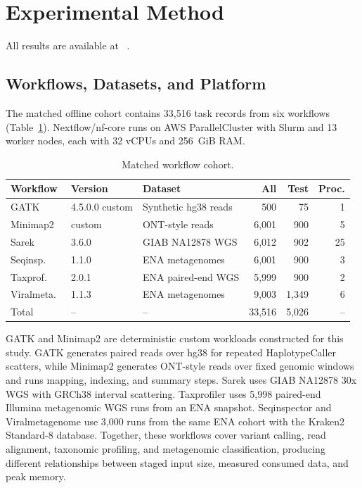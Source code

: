 \section{Experimental Method}
\label{sec:experiments}
All results are available at ~\cite{campArtifact}.

\subsection{Workflows, Datasets, and Platform}

The matched offline cohort contains 33,516 task records from six workflows
(Table~\ref{tab:cohort}). Nextflow/nf-core
\cite{ditommaso2017nextflow,nfcoreFramework} runs on AWS ParallelCluster with
Slurm and 13 worker nodes, each with 32 vCPUs and 256~GiB RAM. %

\begin{table}[t]
\caption{Matched workflow cohort.}
\label{tab:cohort}
\centering
\small
\setlength{\tabcolsep}{1.4pt}
\renewcommand{\arraystretch}{1.05}
\begin{tabular}{@{}l l p{} r r r@{}}
\toprule
Workflow & Version & Dataset & All & Test & Proc. \\
\midrule
GATK & 4.5.0.0 custom & Synthetic hg38 reads & 500 & 75 & 1 \\
Minimap2 & custom & ONT-style reads & 6,001 & 900 & 5 \\
Sarek~\cite{nfcoreSarekGithub} & 3.6.0 & GIAB NA12878 WGS & 6,012 & 902 & 25 \\
Seqinsp.~\cite{nfcoreSeqinspectorGithub} & 1.1.0 & ENA metagenomes & 6,001 & 900 & 3 \\
Taxprof.~\cite{nfcoreTaxprofilerGithub} & 2.0.1 & ENA paired-end WGS & 5,999 & 900 & 2 \\
Viralmeta.~\cite{nfcoreViralmetagenomeGithub} & 1.1.3 & ENA metagenomes & 9,003 & 1,349 & 6 \\
\midrule
Total & -- & -- & 33,516 & 5,026 & -- \\
\bottomrule
\end{tabular}
\end{table}

GATK and Minimap2 are deterministic custom workloads constructed for this
study. GATK generates paired reads over hg38 for repeated HaplotypeCaller
scatters, while Minimap2 generates ONT-style reads over fixed genomic windows
and runs mapping, indexing, and summary steps. Sarek uses GIAB NA12878 30x WGS
with GRCh38 interval scattering. Taxprofiler uses 5,998 paired-end Illumina
metagenomic WGS runs from an ENA snapshot. Seqinspector and Viralmetagenome use
3,000 runs from the same ENA cohort with the Kraken2 Standard-8 database.
Together, these workflows cover variant calling, read alignment, taxonomic
profiling, and metagenomic classification, producing different relationships
between staged input size, measured consumed data, and peak memory.

